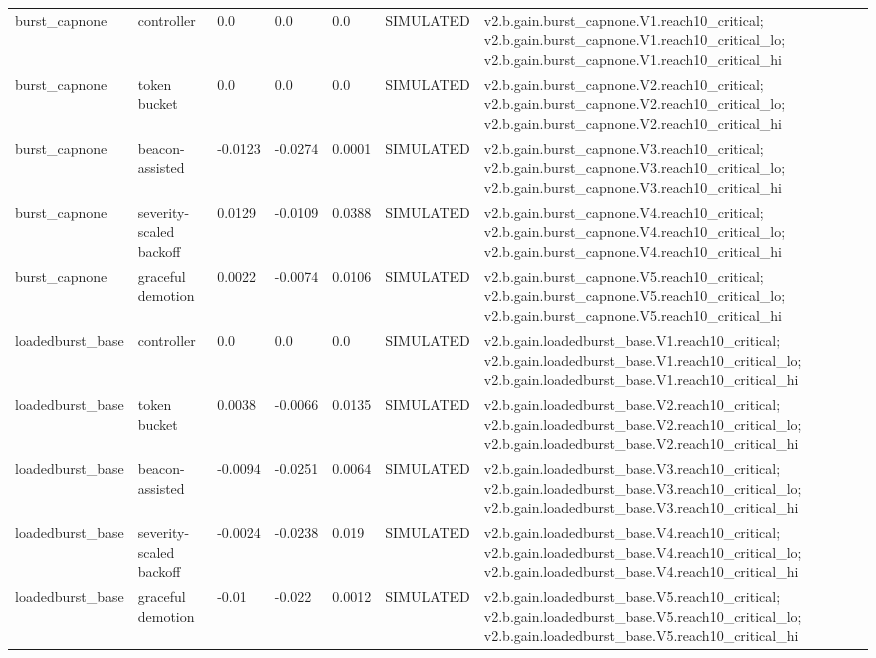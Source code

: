 \begin{table}[t]
\begin{tabular}{lllllll}
burst\_capnone & controller & 0.0 & 0.0 & 0.0 & SIMULATED & v2.b.gain.burst\_capnone.V1.reach10\_critical; v2.b.gain.burst\_capnone.V1.reach10\_critical\_lo; v2.b.gain.burst\_capnone.V1.reach10\_critical\_hi \\
burst\_capnone & token bucket & 0.0 & 0.0 & 0.0 & SIMULATED & v2.b.gain.burst\_capnone.V2.reach10\_critical; v2.b.gain.burst\_capnone.V2.reach10\_critical\_lo; v2.b.gain.burst\_capnone.V2.reach10\_critical\_hi \\
burst\_capnone & beacon-assisted & -0.0123 & -0.0274 & 0.0001 & SIMULATED & v2.b.gain.burst\_capnone.V3.reach10\_critical; v2.b.gain.burst\_capnone.V3.reach10\_critical\_lo; v2.b.gain.burst\_capnone.V3.reach10\_critical\_hi \\
burst\_capnone & severity-scaled backoff & 0.0129 & -0.0109 & 0.0388 & SIMULATED & v2.b.gain.burst\_capnone.V4.reach10\_critical; v2.b.gain.burst\_capnone.V4.reach10\_critical\_lo; v2.b.gain.burst\_capnone.V4.reach10\_critical\_hi \\
burst\_capnone & graceful demotion & 0.0022 & -0.0074 & 0.0106 & SIMULATED & v2.b.gain.burst\_capnone.V5.reach10\_critical; v2.b.gain.burst\_capnone.V5.reach10\_critical\_lo; v2.b.gain.burst\_capnone.V5.reach10\_critical\_hi \\
loadedburst\_base & controller & 0.0 & 0.0 & 0.0 & SIMULATED & v2.b.gain.loadedburst\_base.V1.reach10\_critical; v2.b.gain.loadedburst\_base.V1.reach10\_critical\_lo; v2.b.gain.loadedburst\_base.V1.reach10\_critical\_hi \\
loadedburst\_base & token bucket & 0.0038 & -0.0066 & 0.0135 & SIMULATED & v2.b.gain.loadedburst\_base.V2.reach10\_critical; v2.b.gain.loadedburst\_base.V2.reach10\_critical\_lo; v2.b.gain.loadedburst\_base.V2.reach10\_critical\_hi \\
loadedburst\_base & beacon-assisted & -0.0094 & -0.0251 & 0.0064 & SIMULATED & v2.b.gain.loadedburst\_base.V3.reach10\_critical; v2.b.gain.loadedburst\_base.V3.reach10\_critical\_lo; v2.b.gain.loadedburst\_base.V3.reach10\_critical\_hi \\
loadedburst\_base & severity-scaled backoff & -0.0024 & -0.0238 & 0.019 & SIMULATED & v2.b.gain.loadedburst\_base.V4.reach10\_critical; v2.b.gain.loadedburst\_base.V4.reach10\_critical\_lo; v2.b.gain.loadedburst\_base.V4.reach10\_critical\_hi \\
loadedburst\_base & graceful demotion & -0.01 & -0.022 & 0.0012 & SIMULATED & v2.b.gain.loadedburst\_base.V5.reach10\_critical; v2.b.gain.loadedburst\_base.V5.reach10\_critical\_lo; v2.b.gain.loadedburst\_base.V5.reach10\_critical\_hi \\

\end{tabular}
\end{table}
